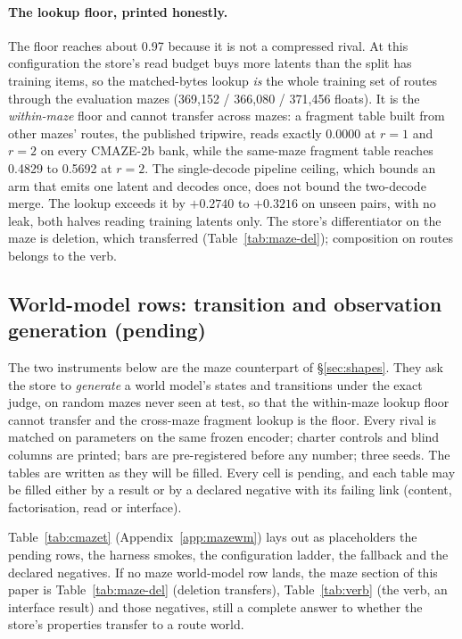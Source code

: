 \documentclass{article} %
\begin{document}
\paragraph{The lookup floor, printed honestly.} The floor reaches about 0.97 because it is not a
compressed rival. At this configuration the store's read budget buys more latents than the split
has training items, so the matched-bytes lookup \emph{is} the whole training set of routes
through the evaluation mazes (369,152 / 366,080 / 371,456 floats). %
It is the \emph{within-maze} floor and cannot transfer across mazes: a fragment table built
from other mazes' routes, the published tripwire, reads exactly 0.0000 at $r=1$ and $r=2$ on
every CMAZE-2b bank, while the same-maze fragment table reaches 0.4829 to 0.5692 at $r=2$.
The single-decode pipeline ceiling, which bounds an arm that emits one latent and decodes once, does not bound the two-decode merge. The lookup exceeds it by $+0.2740$ to $+0.3216$ on unseen pairs,
with no leak, both halves reading training latents only.
The store's differentiator on the maze is deletion, which transferred (Table~\ref{tab:maze-del}); composition on routes belongs to the verb.

\subsection{World-model rows: transition and observation generation (pending)}
\label{sec:maze-wm}

The two instruments below are the maze counterpart of \S\ref{sec:shapes}. They ask the store to
\emph{generate} a world model's states and transitions under the exact judge, on random mazes
never seen at test, so that the within-maze lookup floor cannot transfer and the cross-maze
fragment lookup is the floor. Every rival is matched on parameters on the same frozen encoder;
charter controls and blind columns are printed; bars are pre-registered before any number; three
seeds. The tables are written as they will be filled. Every cell is pending, and each table may be
filled either by a result or by a declared negative with its failing link (content,
factorisation, read or interface).

Table~\ref{tab:cmazet} (Appendix~\ref{app:mazewm}) lays out as placeholders the pending rows,
the harness smokes, the configuration ladder, the fallback and the declared negatives. If no
maze world-model row lands, the maze section of this paper is Table~\ref{tab:maze-del}
(deletion transfers), Table~\ref{tab:verb} (the verb, an interface result) and those negatives, still a complete answer to whether the store's properties transfer to a route world.
\end{document}

